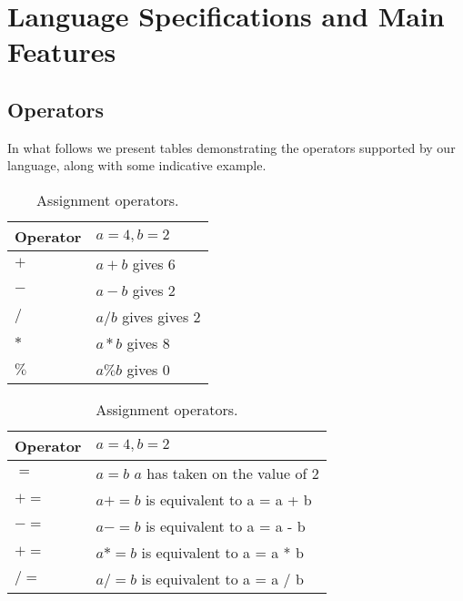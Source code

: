 \section{Language Specifications and Main Features}
\label{sect:spec}

\subsection{Operators}
In what follows we present tables demonstrating the operators supported by our 
language, along with some indicative example. 


\begin{table}[h]
\begin{center}
    \parbox{.45\linewidth}{
        \begin{tabular}{| l | l |}
        \hline
        Operator & $a=4, b=2$ \\ \hline
        $+$ &  $a + b$ gives 6 \\  \hline
        $-$ &  $a - b$ gives 2  \\ \hline
        $/$ &  $a / b$ gives gives 2 \\ \hline
        $*$ &  $a * b$ gives 8  \\ \hline
        $\%$ & $a \% b$ gives 0 \\ \hline
        \end{tabular}
        \caption{Arithmetic operators.}
    }
    \parbox{.45\linewidth}{
        \begin{tabular}{| l | l |}
        \hline
        Operator & $a=4, b=2$ \\ \hline
        $=$  &  $a = b$  $a$ has taken on the value of 2 \\ \hline
        $+=$ &  $a += b$ is equivalent to a = a + b\\ \hline
        $-=$ &  $a -= b$ is equivalent to a = a - b \\ \hline
        $+=$ &  $a *= b$ is equivalent to a = a * b\\ \hline
        $/=$ &  $a /= b$ is equivalent to a = a / b\\ \hline
        \end{tabular}
        \caption{Assignment operators.}
    }
\end{center}
\end{table}

